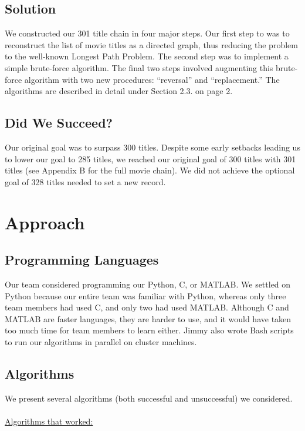 \documentclass[11pt,english]{article}
\begin{document}
\subsection{Solution}
We constructed our 301 title chain in four major steps. Our first step to was to
reconstruct the list of movie titles as a directed graph, thus reducing the
problem to the well-known Longest Path Problem. The second step was to
implement a simple brute-force algorithm. The final two steps involved
augmenting this brute-force algorithm with two new procedures: ``reversal'' and
``replacement.'' The algorithms are described in detail under Section 2.3. on
page 2.

\subsection{Did We Succeed?}
Our original goal was to surpass 300 titles. Despite some early setbacks
leading us to lower our goal to 285 titles, we reached our original goal of 300
titles with 301 titles (see Appendix B for the full movie chain). We did not
achieve the optional goal of 328 titles needed to set a new record.

\section{Approach}

%
\subsection{Programming Languages}
Our team considered programming our Python, C, or MATLAB. We
settled on Python because our entire team was familiar with Python, whereas
only three team members had used C, and only two had used MATLAB. Although C
and MATLAB are faster languages, they are harder to use, and it would have
taken too much time for team members to learn either. Jimmy also wrote Bash
scripts to run our algorithms in parallel on cluster machines.

\subsection{Algorithms}
We present several algorithms (both successful and unsuccessful) we
considered.\\\\
\underline{Algorithms that worked:}
\end{document}
